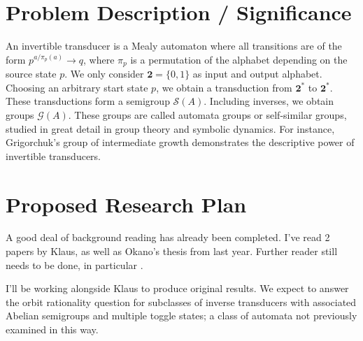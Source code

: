 \documentclass[11pt]{article}
\title{\concourse{SCS Senior Thesis Prospectus}}
\author{\concourse{Evan Bergeron}\\
\concourse{Advisor: Klaus Sutner}}
\date{\concourse{\today}}
\theoremstyle{pleasant}
\newcommand{\0}{\underline{0}}
\newcommand{\1}{\underline{1}}
\newcommand{\2}{\textbf{2}}
\renewcommand{\S}{\mathcal{S}}
\renewcommand{\G}{\mathcal{G}}
\begin{document}
\maketitle

\begin{abstract}
We intend to study iterated transductions defined by a class of invertible transducers over the binary alphabet. Previous work has investigated orbit checking algorithms and the orbit rationality problem for a subclass of automata associated with Abelian free groups and monoids of finite rank.

We intend to answer these same questions for increasingly large subclasses of invertible transducers.
\end{abstract}
\section{Problem Description / Significance}

An invertible transducer is a Mealy automaton where all transitions are of the form $p^{a/\pi_p(a)}\rightarrow q$, where $\pi_p$ is a permutation of the alphabet depending on the source state $p$. We only consider $\textbf{2} = \{ 0, 1 \}$ as input and output alphabet. Choosing an arbitrary start state $p$, we obtain a transduction from $\2^*$ to $\2^*$. These transductions form a semigroup $\S(A)$. Including inverses, we obtain groups $\G(A)$. These groups are called automata groups or self-similar groups, studied in great detail in group theory and symbolic dynamics. For instance, Grigorchuk's group of intermediate growth demonstrates the descriptive power of invertible transducers.
\section{Proposed Research Plan}

A good deal of background reading has already been completed. I've read 2 papers by Klaus, as well as Okano's thesis from last year. Further reader still needs to be done, in particular \cite{NekrashevychSidki04:automorphisms}.

I'll be working alongside Klaus to produce original results. We expect to answer the orbit rationality question for subclasses of inverse transducers with associated Abelian semigroups and multiple toggle states; a class of automata not previously examined in this way.

\end{document}
